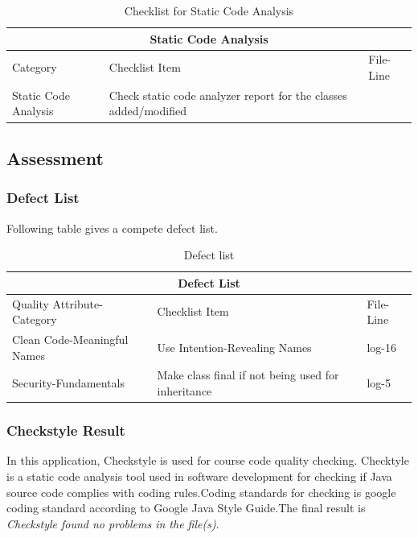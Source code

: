 \documentclass[15pt]{article}
\begin{document}
\begin{CJK*}{UTF8}{gbsn}
{\begin{table}[htp]
\centering
\caption{Checklist for Static Code Analysis}
\begin{tabular}{@{}|l|l|l|@{}}
\toprule
\multicolumn{3}{|c|}{Static Code Analysis}                                                          \\ \midrule
Category             & Checklist Item                                                   & File-Line \\ \midrule
Static Code Analysis & Check static code analyzer report for the classes added/modified &           \\ \bottomrule
\end{tabular}
\end{table}

\subsection{Assessment}
\subsubsection{Defect List}
Following table gives a compete defect list.
\begin{table}[htp]
\centering
\caption{Defect list}
\begin{tabular}{@{}|l|l|l|@{}}
\toprule
\multicolumn{3}{|c|}{Defect List}                          \\ \midrule
Quality Attribute-Category         & Checklist Item                            & File-Line \\ \midrule
Clean Code-Meaningful Names & Use Intention-Revealing Names             & log-16    \\ \midrule
Security-Fundamentals & Make class final if not being used for inheritance             & log-5    \\ \midrule

\end{tabular}
\end{table}

\subsubsection{Checkstyle Result}
In this application, Checkstyle\cite{3} is used for course code quality checking. Checktyle is a static code analysis tool used in software development for checking if Java source code complies with coding rules\cite{3}.Coding standards for checking is google coding standard according to Google Java Style Guide\cite{4}.The final result is \textit{Checkstyle found no problems in the file(s)}.\\

}
\end{CJK*}
\end{document}
